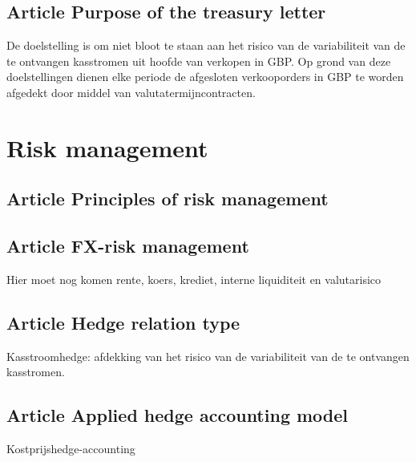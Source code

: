\subsection*{Article \theartikel \hspace{1em} Purpose of the treasury letter}
De doelstelling is om niet bloot te staan aan het risico van de variabiliteit van de te ontvangen kasstromen uit hoofde van verkopen in GBP. Op grond van deze doelstellingen dienen elke periode de afgesloten verkooporders in GBP te worden afgedekt door middel van valutatermijncontracten.

\section*{Risk management}
\subsection*{Article \theartikel \hspace{1em} Principles of risk management}


\subsection*{Article \theartikel \hspace{1em} FX-risk management}
Hier moet nog komen rente, koers, krediet, interne liquiditeit en valutarisico



\subsection*{Article \theartikel \hspace{1em} Hedge relation type}
Kasstroomhedge: afdekking van het risico van de variabiliteit van de te ontvangen kasstromen.


\subsection*{Article \theartikel \hspace{1em} Applied hedge accounting model}
Kostprijshedge-accounting


